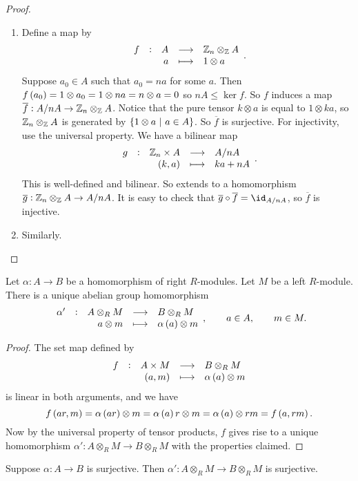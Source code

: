 \begin{proof}
\hfill
\begin{enumerate}
\item Define a map by
$$ \function[f]{A}{\ZZ_n \otimes_\ZZ A}{a}{1 \otimes a}. $$
Suppose $ a_0 \in A $ such that $ a_0 = na $ for some $ a $. Then $ f\br{a_0} = 1 \otimes a_0 = 1 \otimes na = n \otimes a = 0 $ so $ nA \le \ker f $. So $ f $ induces a map $ \overline{f} : A / nA \to \mathbb{Z}_n \otimes_{\mathbb{Z}} A $. Notice that the pure tensor $ k \otimes a $ is equal to $ 1 \otimes ka $, so $ \mathbb{Z}_n \otimes_{\mathbb{Z}} A $ is generated by $ \cbr{1 \otimes a \st a \in A} $. So $ \overline{f} $ is surjective. For injectivity, use the universal property. We have a bilinear map
$$ \function[g]{\ZZ_n \times A}{A / nA}{\br{k, a}}{ka + nA}. $$
This is well-defined and bilinear. So extends to a homomorphism $ \overline{g} : \mathbb{Z}_n \otimes_{\mathbb{Z}} A \to A / nA $. It is easy to check that $ \overline{g} \circ \overline{f} = \id_{A / nA} $, so $ \overline{f} $ is injective.
\item Similarly.
\end{enumerate}
\end{proof}

\pagebreak


\begin{proposition}
Let $ \alpha : A \to B $ be a homomorphism of right $ R $-modules. Let $ M $ be a left $ R $-module. There is a unique abelian group homomorphism
$$ \function[\alpha']{A \otimes_R M}{B \otimes_R M}{a \otimes m}{\alpha\br{a} \otimes m}, \qquad a \in A, \qquad m \in M. $$
\end{proposition}

\begin{proof}
The set map defined by
$$ \function[f]{A \times M}{B \otimes_R M}{\br{a, m}}{\alpha\br{a} \otimes m} $$
is linear in both arguments, and we have
$$ f\br{ar, m} = \alpha\br{ar} \otimes m = \alpha\br{a}r \otimes m = \alpha\br{a} \otimes rm = f\br{a, rm}. $$
Now by the universal property of tensor products, $ f $ gives rise to a unique homomorphism $ \alpha' : A \otimes_R M \to B \otimes_R M $ with the properties claimed.
\end{proof}

\begin{proposition}
Suppose $ \alpha : A \to B $ is surjective. Then $ \alpha' : A \otimes_R M \to B \otimes_R M $ is surjective.
\end{proposition}

